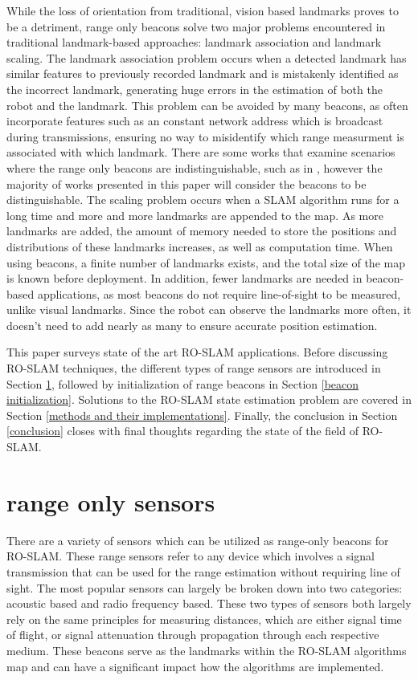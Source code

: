 \documentclass[conference]{IEEEtran}
\begin{document}
		While the loss of orientation from traditional, vision based landmarks  proves to be a detriment, range only beacons solve two major problems encountered in traditional landmark-based approaches: landmark association and landmark scaling. The landmark association problem occurs when a detected landmark has similar features to previously recorded landmark and is mistakenly identified as the incorrect landmark, generating huge errors in the estimation of both the robot and the landmark. This problem can be avoided by many beacons, as often incorporate features such as an constant network address which is broadcast during transmissions, ensuring no way to misidentify which range measurment is associated with which landmark. There are some works that examine scenarios where the range only beacons are indistinguishable, such as in \cite{Jaulin2016} , however the majority of works presented in this paper will consider the beacons to be distinguishable. The scaling problem occurs when a SLAM algorithm runs for a long time and more and more landmarks are appended to the map. As more landmarks are added, the amount of memory needed to store the positions and distributions of these landmarks increases, as well as computation time. When using beacons, a finite number of landmarks exists, and the total size of the map is known before deployment. In addition, fewer landmarks are needed in beacon-based applications, as most beacons do not require line-of-sight to be measured, unlike visual landmarks. Since the robot can observe the landmarks more often, it doesn't need to add nearly as many to ensure accurate position estimation. %
		
		This paper surveys state of the art RO-SLAM applications. Before discussing RO-SLAM techniques, the different types of range sensors are introduced in Section \ref{range only sensors}, followed by initialization of range beacons in Section \ref{beacon initialization}. Solutions to the RO-SLAM state estimation problem are covered in Section \ref{methods and their implementations}. Finally, the conclusion in Section \ref{conclusion} closes with final thoughts regarding the state of the field of RO-SLAM.
	
	
	\section{range only sensors}
	\label{range only sensors}
		There are a variety of sensors which can be utilized as range-only beacons for RO-SLAM. These range sensors refer to any device which involves a signal transmission that can be used for the range estimation without requiring line of sight. The most popular sensors can largely be broken down into two categories: acoustic based and radio frequency based. These two types of sensors both largely rely on the same principles for measuring distances, which are either signal time of flight, or signal attenuation through propagation through each respective medium. These beacons serve as the landmarks within the RO-SLAM algorithms map and can have a significant impact how the algorithms are implemented.
	
\end{document}
